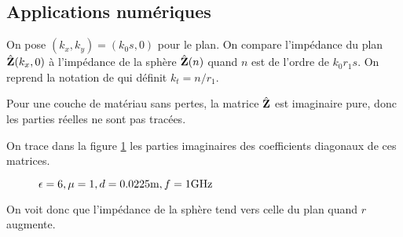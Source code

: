   \subsection{Applications numériques}
    On pose \((k_x,k_y) = (k_0 s, 0)\) pour le plan.
    On compare l'impédance du plan \(\hat{\mathbf{Z}}(k_x,0)\) à l'impédance de la sphère \(\hat{\mathbf{Z}}(n)\) quand \(n\) est de l'ordre de \(k_0r_1s\).
    On reprend la notation de \cite[p.~62]{hoppe_impedance_1995} qui définit \(k_t= n/r_1\).

    Pour une couche de matériau sans pertes, la matrice \(\hat{\mathbf{Z}}\) est imaginaire pure, donc les parties réelles ne sont pas tracées.

    On trace dans la figure \ref{fig:imp_fourier:sphere:hoppe_p62:converge_rayon} les parties imaginaires des coefficients diagonaux de ces matrices.

    \begin{figure}[!hbt]
      \centering
      
      \caption{\(\epsilon = 6, \mu = 1, d=0.0225\text{m}, f=1\text{GHz}\)}
      \label{fig:imp_fourier:sphere:hoppe_p62:converge_rayon}
    \end{figure}
     On voit donc que l'impédance de la sphère tend vers celle du plan quand \(r\) augmente.